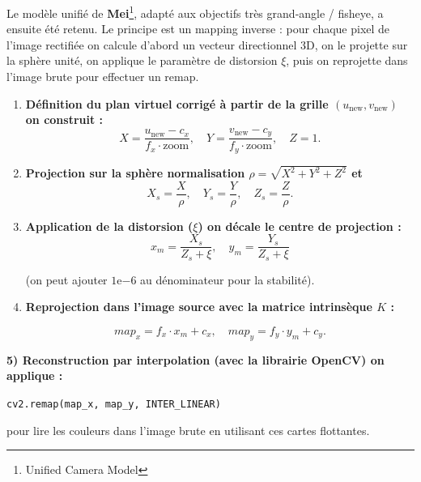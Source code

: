 \documentclass[12pt,a4paper,oneside]{report}
\begin{document}
\hspace*{.5cm} Le modèle unifié de \textbf{Mei}\footnote{Unified Camera Model}, adapté aux objectifs très grand‑angle / fisheye, a ensuite été retenu. Le principe est un mapping inverse : pour chaque pixel de l'image rectifiée on calcule d'abord un vecteur directionnel 3D, on le projette sur la sphère unité, on applique le paramètre de distorsion $\xi$, puis on reprojette dans l'image brute pour effectuer un remap.\\

\newpage



\begin{enumerate}[label=\arabic*) , leftmargin=0pt]
\item \textbf{Définition du plan virtuel corrigé à partir de la grille $(u_{\text{new}},v_{\text{new}})$ on construit :}\\

\texttt{\[
X=\frac{u_{\text{new}}-c_x}{f_x\cdot\text{zoom}},\quad Y=\frac{v_{\text{new}}-c_y}{f_y\cdot\text{zoom}},\quad Z=1.
\]}

\bigskip

\item \textbf{Projection sur la sphère normalisation $\rho=\sqrt{X^2+Y^2+Z^2}$ et}\\

\texttt{\[
X_s=\frac{X}{\rho},\quad Y_s=\frac{Y}{\rho},\quad Z_s=\frac{Z}{\rho}.
\]}

\bigskip

\item \textbf{Application de la distorsion ($\xi$) on décale le centre de projection :}\\

\texttt{\[
x_m=\frac{X_s}{Z_s+\xi},\quad y_m=\frac{Y_s}{Z_s+\xi}
\]}
\bigskip

(on peut ajouter $1\mathrm{e}{-6}$ au dénominateur pour la stabilité).\\


\bigskip

\item \textbf{Reprojection dans l'image source avec la matrice intrinsèque $K$ :}

\texttt{\[
map_x=f_x\cdot x_m + c_x,\quad map_y=f_y\cdot y_m + c_y.
\]}
\end{enumerate}

\noindent\textbf{ 5) Reconstruction par interpolation (avec la librairie OpenCV) on applique :}

\begin{center}
\texttt{cv2.remap(map\_x, map\_y, INTER\_LINEAR)}
\end{center}
pour lire les couleurs dans l'image brute en utilisant ces cartes flottantes. 
\end{document}
